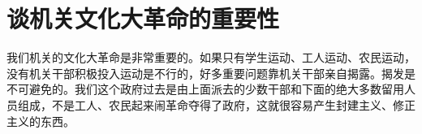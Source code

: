 \section[谈机关文化大革命的重要性（一九六七年一月九日）]{谈机关文化大革命的重要性}


我们机关的文化大革命是非常重要的。如果只有学生运动、工人运动、农民运动，没有机关干部积极投入运动是不行的，好多重要问题靠机关干部亲自揭露。揭发是不可避免的。我们这个政府过去是由上面派去的少数干部和下面的绝大多数留用人员组成，不是工人、农民起来闹革命夺得了政府，这就很容易产生封建主义、修正主义的东西。

